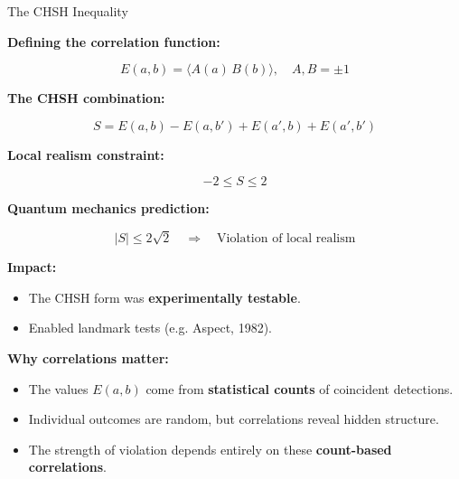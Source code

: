 \begin{frame}{The CHSH Inequality}

\begin{minipage}{0.58\textwidth}

\textbf{Defining the correlation function:}

\vspace{-0.5cm}

\[
E(a,b) = \langle A(a) \, B(b) \rangle,
\quad A, B = \pm 1
\]

\pause

\vspace{-0.2cm}

\textbf{The CHSH combination:}

\vspace{-0.6cm}

\[
S = E(a, b) - E(a, b') + E(a', b) + E(a', b')
\]

\pause

\vspace{-0.3cm}

\textbf{Local realism constraint:}

\vspace{-0.5cm}

\[
-2 \leq S \leq 2
\]

\pause

\vspace{-0.3cm}

\textbf{Quantum mechanics prediction:}

\vspace{-0.6cm}

\[
|S| \leq 2\sqrt{2} \quad \Rightarrow \quad \text{Violation of local realism}
\]

\pause

\vspace{-0.3cm}


\textbf{Impact:}
\begin{itemize}
  \item The CHSH form was \textbf{experimentally testable}.
  \item Enabled landmark tests (e.g. Aspect, 1982).
\end{itemize}

\end{minipage}
\hfill
\begin{minipage}{0.36\textwidth}

\textbf{Why correlations matter:}

\begin{itemize}
  \item The values $E(a,b)$ come from \textbf{statistical counts} of coincident detections.
  \item Individual outcomes are random, but correlations reveal hidden structure.
  \item The strength of violation depends entirely on these \textbf{count-based correlations}.
\end{itemize}

\end{minipage}

\end{frame}



